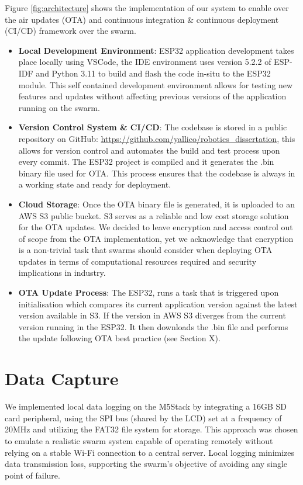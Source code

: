 \documentclass{report}
\begin{document}
Figure \ref{fig:architecture} shows the implementation of our system to enable over the air updates (OTA) and continuous integration \& continuous deployment (CI/CD) framework over the swarm. 
\begin{itemize}
    \item \textbf{Local Development Environment}: ESP32 application development takes place locally using VSCode, the IDE environment uses version 5.2.2 of ESP-IDF and Python 3.11 to build and flash the code in-situ to the ESP32 module. This self contained development environment allows for testing new features and updates without affecting previous versions of the application running on the swarm.
    \item \textbf{Version Control System \& CI/CD}: The codebase is stored in a public repository on GitHub: \url{https://github.com/yallico/robotics_dissertation}, this allows for version control and automates the build and test process upon every commit. The ESP32 project is compiled and it generates the .bin binary file used for OTA. This process ensures that the codebase is always in a working state and ready for deployment.
    \item \textbf{Cloud Storage}: Once the OTA binary file is generated, it is uploaded to an AWS S3 public bucket. S3 serves as a reliable and low cost storage solution for the OTA updates. We decided to leave encryption and access control out of scope from the OTA implementation, yet we acknowledge that encryption is a non-trivial task that swarms should consider when deploying OTA updates in terms of computational resources required and security implications in industry. %
    \item \textbf{OTA Update Process}: The ESP32, runs a task that is triggered upon initialisation which compares its current application version against the latest version available in S3. If the version in AWS S3 diverges from the current version running in the ESP32. It then downloads the .bin file and performs the update following OTA best practice (see Section X). %

\end{itemize}

\section{Data Capture}
We implemented local data logging on the M5Stack by integrating a 16GB SD card peripheral, using the SPI bus (shared by the LCD) set at a frequency of 20MHz and utilizing the FAT32 file system for storage. This approach was chosen to emulate a realistic swarm system capable of operating remotely without relying on a stable Wi-Fi connection to a central server. Local logging minimizes data transmission loss, supporting the swarm's objective of avoiding any single point of failure. 
\end{document}
